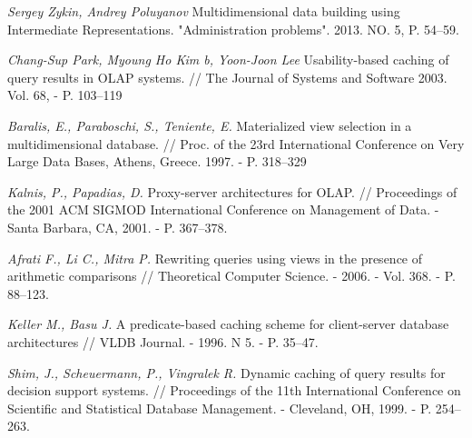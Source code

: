 \begin{thebibliography}{9}
\textit{Sergey Zykin, Andrey Poluyanov}
Multidimensional data building using Intermediate Representations.
"Administration problems".
2013.
NO. 5, P. 54--59.

\textit{Chang-Sup Park, Myoung Ho Kim b, Yoon-Joon Lee}
Usability-based caching of query results in OLAP systems.
// The Journal of Systems and Software
2003.
Vol. 68, - P. 103--119

\textit{Baralis, E., Paraboschi, S., Teniente, E.}
Materialized view selection in a multidimensional database.
// Proc. of the 23rd International Conference on Very Large Data Bases,
Athens, Greece.
1997.
- P. 318--329

\textit{Kalnis, P., Papadias, D.}
Proxy-server architectures for OLAP.
// Proceedings of the 2001 ACM SIGMOD International Conference on Management of Data.
- Santa Barbara, CA, 2001.
- P. 367--378.

\textit{Afrati F., Li C., Mitra P.}
Rewriting queries using views in the presence of arithmetic comparisons
// Theoretical Computer Science.
- 2006.
- Vol. 368.
- P. 88--123.

\textit{Keller M., Basu J.}
A predicate-based caching scheme for client-server database architectures
// VLDB Journal.
- 1996. N 5.
- P. 35--47.

\textit{Shim, J., Scheuermann, P., Vingralek R.}
Dynamic caching of query results for decision support systems.
// Proceedings of the 11th International Conference on Scientific and Statistical Database Management.
- Cleveland, OH, 1999.
- P. 254--263.

\end{thebibliography}